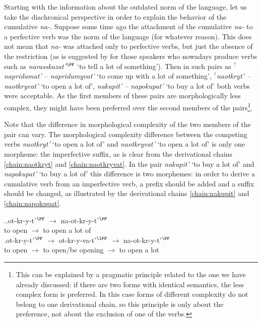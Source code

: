 Starting with the information about the outdated norm of the language, let us take the diachronical perspective in order to explain the behavior of the cumulative \textit{na-}. Suppose some time ago the attachment of the cumulative \textit{na-} to a perfective verb was the norm of the language (for whatever reason). This does not mean that \textit{na-} was attached only to perfective verbs, but just the absence of the restriction (as is suggested by \citet{Tatevosov:13a} for those speakers who nowadays produce verbs such as \textit{narasskazat'}$^{\PF}$ `to tell a lot of something'). Then in such pairs as \textit{$^?$napridumat' -- napridumyvat'} `to come up with a lot of something', \textit{$^?$naotkryt' -- naotkryvat'} `to open a lot of', \textit{nakupit' -- napokupat'} `to buy a lot of' both verbs were acceptable. As the first members of these pairs are morphologically less complex, they might have been preferred over the second members of the pairs\footnote{This can be explained by a pragmatic principle related to the one we have already discussed: if there are two forms with identical semantics, the less complex form is preferred. In this case forms of different complexity do not belong to one derivational chain, so this principle is only about the preference, not about the exclusion of one of the verbs.}. 

Note that the difference in morphological complexity of the two members of the pair can vary. The morphological complexity difference between the competing verbs \textit{naotkryt'} `to open a lot of' and \textit{naotkryvat'} `to open a lot of' is only one morpheme: the imperfective suffix, as is clear from the derivational chains \ref{chain:naotkryt} and \ref{chain:naotkryvat}. In the pair  \textit{nakupit'} `to buy a lot of' and  \textit{napokupat'} `to buy a lot of' this difference is two morphemes: in order to derive a cumulative verb from an imperfective verb, a prefix should be added and a suffix should be changed, as illustrated by the derivational chains \ref{chain:nakupit} and \ref{chain:napokupat}.

\ex.\ag.\label{chain:naotkryt}ot-kr-y-t'$^{\PF}$ $\rightarrow$ na-ot-kr-y-t'$^{\PF}$\\
{to open} $\rightarrow$ {to open a lot of}\\
\bg.\label{chain:naotkryvat}ot-kr-y-t'$^{\PF}$ $\rightarrow$ ot-kr-y-va-t'$^{\IPF}$ $\rightarrow$ na-ot-kr-y-t'$^{\PF}$\\
{to open} $\rightarrow$ {to open/be opening} $\rightarrow$ {to open a lot}\\

